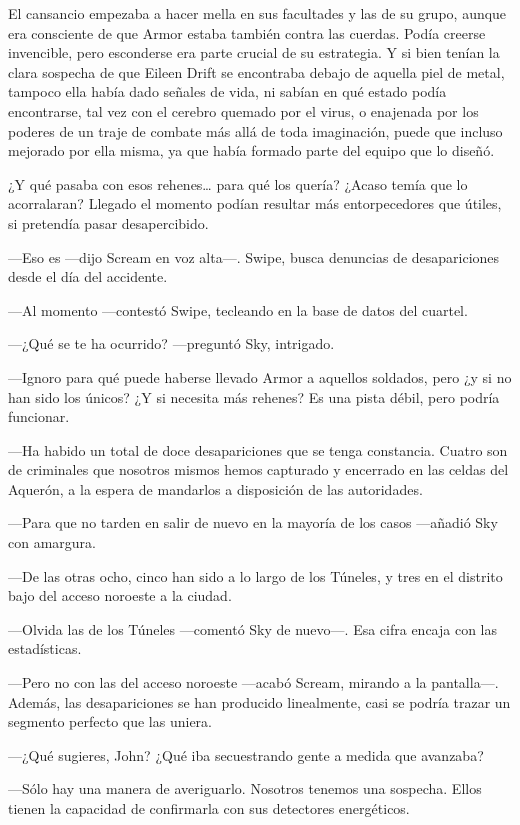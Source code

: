 El cansancio empezaba a hacer mella en sus facultades y las de su grupo, aunque era consciente de que Armor estaba también contra las cuerdas. Podía creerse invencible, pero esconderse era parte crucial de su estrategia. Y si bien tenían la clara sospecha de que Eileen Drift se encontraba debajo de aquella piel de metal, tampoco ella había dado señales de vida, ni sabían en qué estado podía encontrarse, tal vez con el cerebro quemado por el virus, o enajenada por los poderes de un traje de combate más allá de toda imaginación, puede que incluso mejorado por ella misma, ya que había formado parte del equipo que lo diseñó.

¿Y qué pasaba con esos rehenes\dots{} para qué los quería? ¿Acaso temía que lo acorralaran? Llegado el momento podían resultar más entorpecedores que útiles, si pretendía pasar desapercibido.

---Eso es ---dijo Scream en voz alta---. Swipe, busca denuncias de desapariciones desde el día del accidente.

---Al momento ---contestó Swipe, tecleando en la base de datos del cuartel.

---¿Qué se te ha ocurrido? ---preguntó Sky, intrigado.

---Ignoro para qué puede haberse llevado Armor a aquellos soldados, pero ¿y si no han sido los únicos? ¿Y si necesita más rehenes? Es una pista débil, pero podría funcionar.

---Ha habido un total de doce desapariciones que se tenga constancia. Cuatro son de criminales que nosotros mismos hemos capturado y encerrado en las celdas del Aquerón, a la espera de mandarlos a disposición de las autoridades.

---Para que no tarden en salir de nuevo en la mayoría de los casos ---añadió Sky con amargura.

---De las otras ocho, cinco han sido a lo largo de los Túneles, y tres en el distrito bajo del acceso noroeste a la ciudad.

---Olvida las de los Túneles ---comentó Sky de nuevo---. Esa cifra encaja con las estadísticas.

---Pero no con las del acceso noroeste ---acabó Scream, mirando a la pantalla---. Además, las desapariciones se han producido linealmente, casi se podría trazar un segmento perfecto que las uniera.

---¿Qué sugieres, John? ¿Qué iba secuestrando gente a medida que avanzaba?

---Sólo hay una manera de averiguarlo. Nosotros tenemos una sospecha. Ellos tienen la capacidad de confirmarla con sus detectores energéticos.

